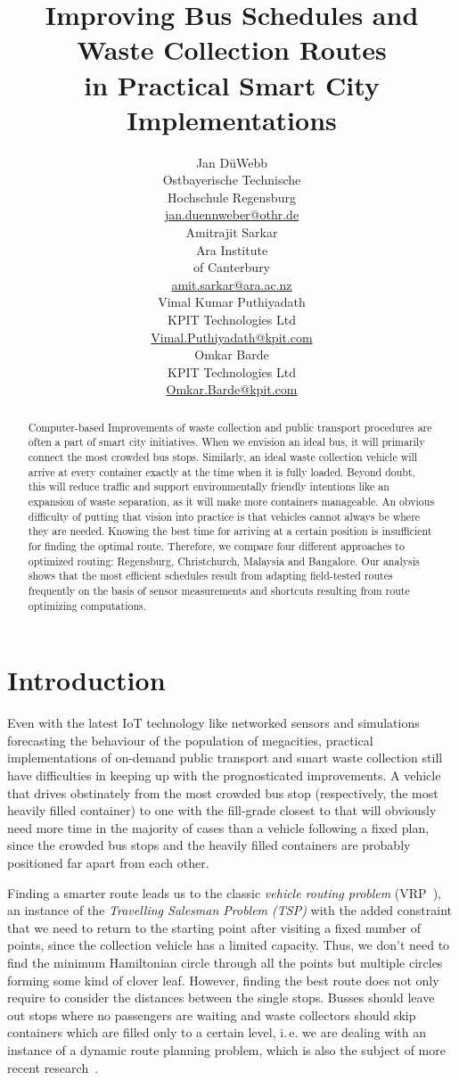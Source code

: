 \documentclass[10pt]{article}
\title{Improving Bus Schedules and Waste Collection Routes \\ in Practical Smart City Implementations}
\author{
  Jan D{\"u}Webb  \\
  Ostbayerische Technische \\ Hochschule Regensburg \\
  {\underline{ jan.duennweber@othr.de} }\\\And 
  Amitrajit Sarkar \\
 Ara Institute \\ of Canterbury \\
  {\underline{amit.sarkar@ara.ac.nz}} \\\And
  Vimal Kumar Puthiyadath \\
 KPIT Technologies Ltd \\
  {\underline{Vimal.Puthiyadath@kpit.com}} \\\And
  Omkar Barde \\
 KPIT Technologies Ltd \\
  {\underline{Omkar.Barde@kpit.com}} 
 }
\date{}
\begin{document}
\maketitle
\begin{abstract}
Computer-based Improvements of waste collection and public transport procedures are 
often a part of smart city initiatives. When we envision an ideal bus, it will 
primarily connect the most crowded bus stops. Similarly, an ideal waste collection 
vehicle will arrive at every container exactly at the time when it is fully loaded. 
Beyond doubt, this will
reduce traffic and support environmentally friendly intentions like an expansion
of waste separation, as it will make more containers manageable.
An obvious difficulty of putting that vision into practice is that
vehicles cannot always be where they are needed.           
Knowing the best time for arriving at a certain position is insufficient for 
finding the optimal route.
Therefore, we compare four different approaches to optimized routing: 
Regensburg, Christchurch, Malaysia and Bangalore. Our analysis shows 
that the most efficient schedules           
result from adapting field-tested routes frequently on the basis of
sensor measurements and shortcuts resulting from route        
optimizing computations.
\end{abstract}

\section{Introduction}
Even with the latest IoT technology like networked sensors and simulations
forecasting the behaviour of the population of megacities, practical implementations 
of on-demand public transport and smart waste collection still have difficulties 
in keeping up with the prognosticated improvements.
A vehicle that drives obstinately from the most crowded bus stop (respectively, the 
most heavily filled container) to one with the fill-grade closest 
to that will obviously need more time in the majority of cases than a vehicle 
following a fixed plan, 
since the crowded bus stops and the heavily filled containers are probably 
positioned far apart from 
each other. 

Finding a smarter route leads us to the classic 
{\it vehicle routing problem} (VRP~\cite{Dantzig59}), an instance of the 
{\it Travelling Salesman Problem (TSP)} with the added constraint that we 
need to return to the starting point after visiting a fixed number of points, 
since the collection vehicle has a limited capacity. 
Thus, we don't need to find the minimum Hamiltonian
circle through all the points but multiple circles forming some kind of
clover leaf. However, finding the best route does not only require to consider the distances between the single stops. Busses should leave out stops where no
passengers are waiting and waste collectors should skip containers which are filled only 
to a certain level, i.\,e. we are dealing with an instance of a dynamic route 
planning problem, which is also the subject of more recent 
research~\cite{Chen16}.
\end{document}

